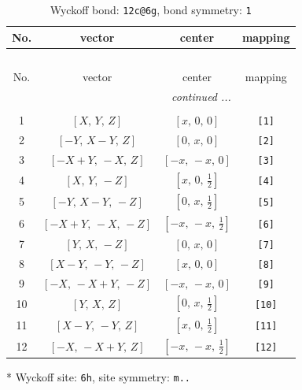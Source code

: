 \documentclass[fleqn,8pt]{jsarticle}
\begin{document}
\begin{longtable}{cccc}
\caption{Wyckoff bond: {\tt 12c@6g}, bond symmetry: {\tt 1}}
 \\
 \hline \hline
No. & vector & center & mapping \\ \hline \endfirsthead

\multicolumn{3}{l}{\tablename\ \thetable{}} \\
 \hline \hline
No. & vector & center & mapping \\ \hline \endhead

 \hline \hline
\multicolumn{3}{r}{\footnotesize\it continued ...} \\ \endfoot

 \hline \hline
\multicolumn{3}{r}{} \\ \endlastfoot

1 & $\left[ X,\, Y,\, Z \right]$ & $\left[ x,\, 0,\, 0 \right]$ & {\tt [1]} \\ \hline
2 & $\left[ - Y,\, X - Y,\, Z \right]$ & $\left[ 0,\, x,\, 0 \right]$ & {\tt [2]} \\ \hline
3 & $\left[ - X + Y,\, - X,\, Z \right]$ & $\left[ - x,\, - x,\, 0 \right]$ & {\tt [3]} \\ \hline
4 & $\left[ X,\, Y,\, - Z \right]$ & $\left[ x,\, 0,\, \frac{1}{2} \right]$ & {\tt [4]} \\ \hline
5 & $\left[ - Y,\, X - Y,\, - Z \right]$ & $\left[ 0,\, x,\, \frac{1}{2} \right]$ & {\tt [5]} \\ \hline
6 & $\left[ - X + Y,\, - X,\, - Z \right]$ & $\left[ - x,\, - x,\, \frac{1}{2} \right]$ & {\tt [6]} \\ \hline
7 & $\left[ Y,\, X,\, - Z \right]$ & $\left[ 0,\, x,\, 0 \right]$ & {\tt [7]} \\ \hline
8 & $\left[ X - Y,\, - Y,\, - Z \right]$ & $\left[ x,\, 0,\, 0 \right]$ & {\tt [8]} \\ \hline
9 & $\left[ - X,\, - X + Y,\, - Z \right]$ & $\left[ - x,\, - x,\, 0 \right]$ & {\tt [9]} \\ \hline
10 & $\left[ Y,\, X,\, Z \right]$ & $\left[ 0,\, x,\, \frac{1}{2} \right]$ & {\tt [10]} \\ \hline
11 & $\left[ X - Y,\, - Y,\, Z \right]$ & $\left[ x,\, 0,\, \frac{1}{2} \right]$ & {\tt [11]} \\ \hline
12 & $\left[ - X,\, - X + Y,\, Z \right]$ & $\left[ - x,\, - x,\, \frac{1}{2} \right]$ & {\tt [12]} \\
\end{longtable}
* Wyckoff site: {\tt 6h}, site symmetry: {\tt m..}
\end{document}
